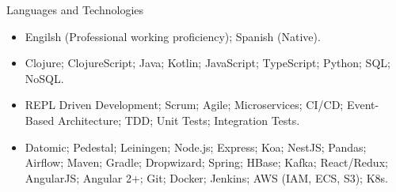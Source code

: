 \documentclass[calibri]{../macdowell-cv/mcdowellcv}
\begin{document}
	\begin{cvsection}{Languages and Technologies}
		\begin{cvsubsection}{}{}{}	
			\begin{itemize}
				\item Engilsh (Professional working proficiency); Spanish (Native).
				\item Clojure; ClojureScript; Java; Kotlin; JavaScript; TypeScript; Python; SQL; NoSQL.
				\item REPL Driven Development; Scrum; Agile; Microservices; CI/CD; Event-Based Architecture; TDD; Unit Tests; Integration Tests.
				\item Datomic; Pedestal; Leiningen; Node.js; Express; Koa; NestJS; Pandas; Airflow; Maven; Gradle; Dropwizard; Spring; HBase; Kafka; React/Redux; AngularJS; Angular 2+; Git; Docker; Jenkins; AWS (IAM, ECS, S3); K8s.
			\end{itemize}
		\end{cvsubsection}
	\end{cvsection}
\end{document}
